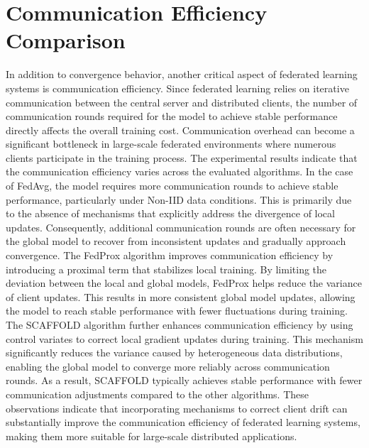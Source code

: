 \documentclass[12pt]{book}
\begin{document}
\section{Communication Efficiency Comparison}
In addition to convergence behavior, another critical aspect of federated learning systems is communication efficiency. Since federated learning relies on iterative communication between the central server and distributed clients, the number of communication rounds required for the model to achieve stable performance directly affects the overall training cost. Communication overhead can become a significant bottleneck in large-scale federated environments where numerous clients participate in the training process.
The experimental results indicate that the communication efficiency varies across the evaluated algorithms. In the case of FedAvg, the model requires more communication rounds to achieve stable performance, particularly under Non-IID data conditions. This is primarily due to the absence of mechanisms that explicitly address the divergence of local updates. Consequently, additional communication rounds are often necessary for the global model to recover from inconsistent updates and gradually approach convergence.
The FedProx algorithm improves communication efficiency by introducing a proximal term that stabilizes local training. By limiting the deviation between the local and global models, FedProx helps reduce the variance of client updates. This results in more consistent global model updates, allowing the model to reach stable performance with fewer fluctuations during training.
The SCAFFOLD algorithm further enhances communication efficiency by using control variates to correct local gradient updates during training. This mechanism significantly reduces the variance caused by heterogeneous data distributions, enabling the global model to converge more reliably across communication rounds. As a result, SCAFFOLD typically achieves stable performance with fewer communication adjustments compared to the other algorithms.
These observations indicate that incorporating mechanisms to correct client drift can substantially improve the communication efficiency of federated learning systems, making them more suitable for large-scale distributed applications.
\end{document}
